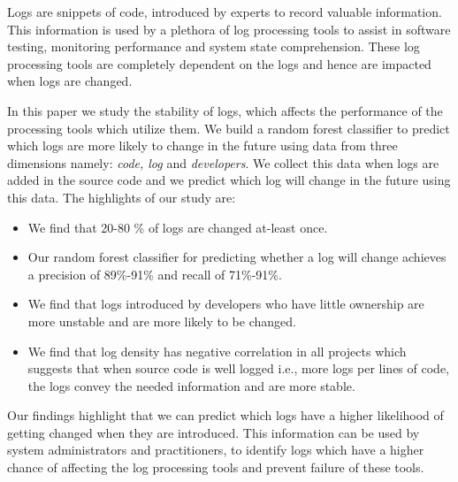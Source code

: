Logs are snippets of code, introduced by experts to record valuable information. This information is used by a plethora of log processing tools to assist in software testing, monitoring performance and system state comprehension. These log processing tools are completely dependent on the logs and hence are impacted when logs are changed.

 In this paper we study the stability of logs, which affects the performance of the processing tools which utilize them. We build a random forest classifier to predict which logs are more likely to change in the future using data from three dimensions namely: \emph{code, log} and \emph{developers}. We collect this data when logs are added in the source code and we predict which log will change in the future using this data. The highlights of our study are:

\begin{itemize}
	\item We find that 20-80 \% of logs are changed at-least once.
	\item Our random forest classifier for predicting whether a log will change achieves a precision of 89\%-91\% and recall of 71\%-91\%. 
	\item We find that logs introduced by developers who have little ownership are more unstable and are more likely to be changed. 	
	\item We find that log density has negative correlation in all projects which suggests that when source code is well logged i.e., more logs per lines of code, the logs convey the needed information and are more stable. 
	
\end{itemize}

Our findings highlight that we can predict which logs have a higher likelihood of getting changed when they are introduced. This information can be used by system administrators and practitioners, to identify logs which have a higher chance of affecting the log processing tools and prevent failure of these tools.  



